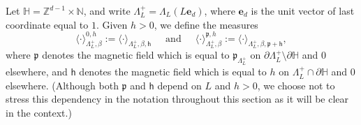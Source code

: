 \documentclass[11pt,a4paper]{article}
\theoremstyle{definition}
\numberwithin{equation}{section}
\begin{document}
Let $\mathbb{H}=\mathbb{Z}^{d-1}\times \mathbb{N}$, and write $\Lambda_L^+=\Lambda_L(L\mathbf{e}_d)$, where $\mathbf{e}_d$ is the unit vector of last coordinate equal to $1$. Given $h>0$,
we define the measures 
\begin{equation}\label{eq:half-space_measures}
\langle \cdot \rangle^{0,h}_{\Lambda_L^+,\beta}:= \langle \cdot \rangle_{\Lambda_L^+,\beta, \mathsf{h}} ~~~~~\text{ and }~~~~~ \langle \cdot \rangle^{\mathfrak{p},h}_{\Lambda_L^+,\beta}:= \langle \cdot \rangle_{\Lambda_L^+,\beta, \mathfrak{p}+\mathsf{h}},
\end{equation}
where $\mathfrak{p}$ denotes the magnetic field which is equal to $\mathfrak{p}_{\Lambda^+_L}$ on $\partial \Lambda_L^+\setminus \partial \mathbb H$ and $0$ elsewhere, and $\mathsf{h}$ denotes the magnetic field which is equal to $h$ on $\Lambda_L^+\cap \partial \mathbb H$ and $0$ elsewhere. (Although both $\mathfrak{p}$ and $\mathsf{h}$ depend on $L$ and $h>0$, we choose not to stress this dependency in the notation throughout this section as it will be clear in the context.)
\end{document}
